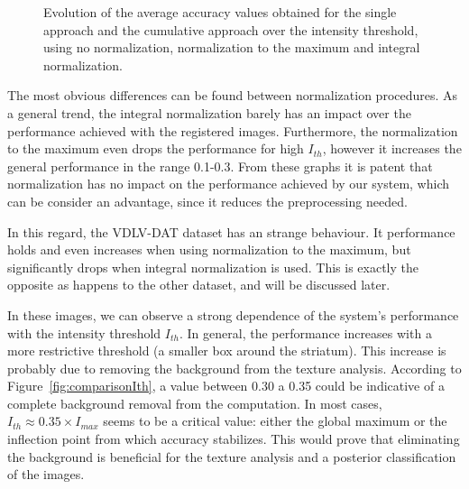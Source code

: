 \begin{figure}
	\caption[Evolution of the average accuracy with the intensity threshold.]{Evolution of the average accuracy values obtained for the single approach and the cumulative approach over the intensity threshold, using no normalization, normalization to the maximum and integral normalization.}
	\label{fig:featuresIth}
\end{figure}

The most obvious differences can be found between normalization procedures. As a general trend, the integral normalization barely has an impact over the performance achieved with the registered images. Furthermore, the normalization to the maximum even drops the performance for high $I_{th}$, however it increases the general performance in the range 0.1-0.3. From these graphs it is patent that normalization has no impact on the performance achieved by our system, which can be consider an advantage, since it reduces the preprocessing needed. 

In this regard, the VDLV-DAT dataset has an strange behaviour. It performance holds and even increases when using normalization to the maximum, but significantly drops when integral normalization is used. This is exactly the opposite as happens to the other dataset, and will be discussed later.  

In these images, we can observe a strong dependence of the system's performance with the intensity threshold $I_{th}$. In general, the performance increases with a more restrictive threshold (a smaller box around the striatum). This increase is probably due to removing the background from the texture analysis. According to Figure~\ref{fig:comparisonIth}, a value between 0.30 a 0.35 could be indicative of a complete background removal from the computation. In most cases, $I_{th}\approx 0.35\times I_{max}$ seems to be a critical value: either the global maximum or the inflection point from which accuracy stabilizes. This would prove that eliminating the background is beneficial for the texture analysis and a posterior classification of the images. 

